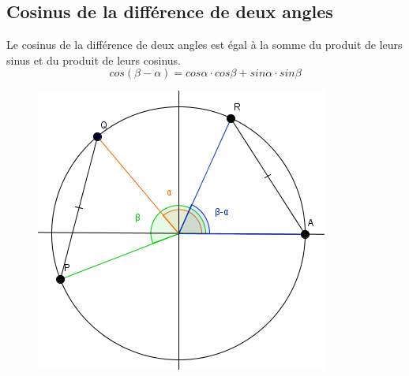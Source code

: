 \documentclass[a4paper,12pt]{article}
\begin{document}
\pagebreak
\subsection{Cosinus de la différence de deux angles}
\begin{theorem}
Le cosinus de la différence de deux angles est égal à la somme du produit de leurs sinus et du produit de leurs cosinus.
\begin{equation}
    cos(\beta-\alpha) = cos \alpha \cdot cos \beta + sin \alpha \cdot sin \beta
\end{equation}
\end{theorem}
\begin{figure}[H]
    \centering
    \includegraphics[scale=0.8]{theorems/cosinus/diff.PNG}
\end{figure}
\end{document}
